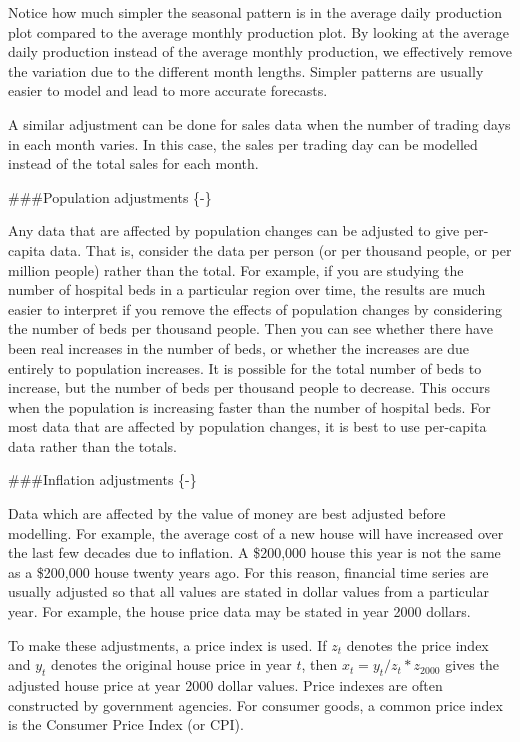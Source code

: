 \documentclass[]{book}
\begin{document}
Notice how much simpler the seasonal pattern is in the average daily production plot compared to the average monthly production plot. By looking at the average daily production instead of the average monthly production, we effectively remove the variation due to the different month lengths. Simpler patterns are usually easier to model and lead to more accurate forecasts.

A similar adjustment can be done for sales data when the number of trading days in each month varies. In this case, the sales per trading day can be modelled instead of the total sales for each month.

\#\#\#Population adjustments \{-\}

Any data that are affected by population changes can be adjusted to give per-capita data. That is, consider the data per person (or per thousand people, or per million people) rather than the total. For example, if you are studying the number of hospital beds in a particular region over time, the results are much easier to interpret if you remove the effects of population changes by considering the number of beds per thousand people. Then you can see whether there have been real increases in the number of beds, or whether the increases are due entirely to population increases. It is possible for the total number of beds to increase, but the number of beds per thousand people to decrease. This occurs when the population is increasing faster than the number of hospital beds. For most data that are affected by population changes, it is best to use per-capita data rather than the totals.

\#\#\#Inflation adjustments \{-\}

Data which are affected by the value of money are best adjusted before modelling. For example, the average cost of a new house will have increased over the last few decades due to inflation. A \$200,000 house this year is not the same as a \$200,000 house twenty years ago. For this reason, financial time series are usually adjusted so that all values are stated in dollar values from a particular year. For example, the house price data may be stated in year 2000 dollars.

To make these adjustments, a price index is used. If \(z_{t}\) denotes the price index and \(y_{t}\) denotes the original house price in year \(t\), then \(x_{t} = y_{t}/z_{t} * z_{2000}\) gives the adjusted house price at year 2000 dollar values. Price indexes are often constructed by government agencies. For consumer goods, a common price index is the Consumer Price Index (or CPI).
\end{document}
